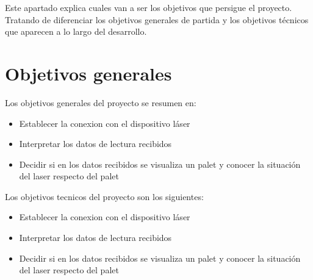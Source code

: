 
Este apartado explica cuales van a ser los objetivos que persigue el proyecto. Tratando de diferenciar los objetivos generales de partida y los objetivos técnicos que aparecen a lo largo del desarrollo.

\section{Objetivos generales}
Los objetivos generales del proyecto se resumen en:
\begin{itemize}
	\item Establecer la conexion con el dispositivo láser
	\item Interpretar los datos de lectura recibidos
	\item Decidir si en los datos recibidos se visualiza un palet y conocer la situación del laser respecto del palet
\end{itemize}

Los objetivos tecnicos del proyecto son los siguientes:
\begin{itemize}
	\item Establecer la conexion con el dispositivo láser
	\item Interpretar los datos de lectura recibidos
	\item Decidir si en los datos recibidos se visualiza un palet y conocer la situación del laser respecto del palet
\end{itemize}
